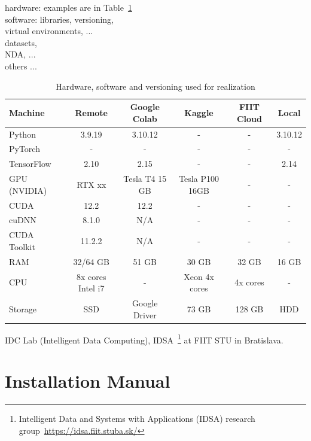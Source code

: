 hardware: examples are in Table~\ref{table:experiments_environment} \\
software: libraries, versioning, \\
virtual environments, ... \\
datasets, \\
NDA, ...\\
others ...


\begin{table}[h!]
    \centering
    \footnotesize
    \begin{tabular}{lccccc}
    \toprule
Machine & Remote    & Google Colab  & Kaggle    & FIIT Cloud    & Local    \\ 
    \midrule
Python      & 3.9.19        & 3.10.12        & - & -    & 3.10.12        \\
PyTorch     & -             & -              & - & -    & -              \\
TensorFlow  & 2.10          & 2.15           & - & -    & 2.14           \\
GPU (NVIDIA) & RTX xx & Tesla T4 15 GB & Tesla P100 16GB & - & -      \\
CUDA        & 12.2          & 12.2           & - & -    & -              \\
cuDNN       & 8.1.0         & N/A            & - & -    & -              \\
CUDA Toolkit & 11.2.2       & N/A            & - & -    & -              \\ 
RAM    & 32/64 GB        & 51 GB & 30 GB     & 32 GB    & 16 GB         \\
CPU  & 8x cores Intel i7   & -  & Xeon 4x cores & 4x cores & -              \\
Storage    & SSD  & Google Driver  & 73 GB & 128 GB & HDD            \\
    \bottomrule
    \end{tabular}
    \caption{Hardware, software and versioning used for realization}
    \label{table:experiments_environment}
\end{table}

IDC Lab (Intelligent Data Computing), IDSA~\footnote{Intelligent Data and Systems with Applications (IDSA) research group~\url{https://idsa.fiit.stuba.sk/} } at FIIT STU in Bratislava.



\section{Installation Manual}
\label{sec:Installation-Manual}

